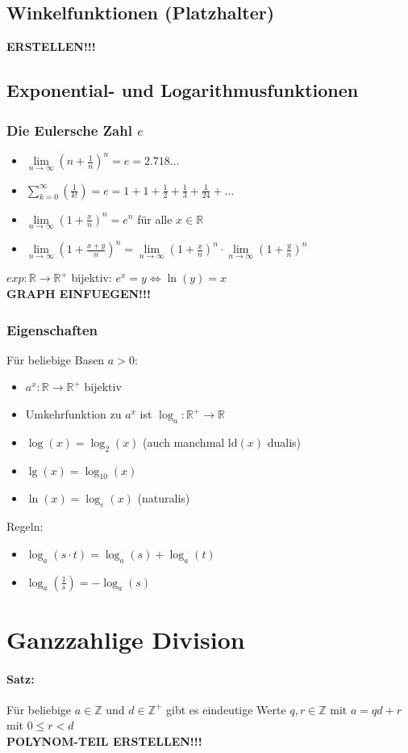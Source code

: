 \subsection{Winkelfunktionen (Platzhalter)}
\textbf{ERSTELLEN!!!}
\subsection{Exponential- und Logarithmusfunktionen}
\subsubsection{Die Eulersche Zahl $e$}
\begin{itemize}
\item $\lim\limits_{n \to \infty}\left(n+\frac{1}{n}\right)^n=e=2.718\ldots$
\item $\sum\limits_{k=0}^{\infty}\left(\frac{1}{k!}\right)=e=1+1+\frac{1}{2}+\frac{1}{3}+\frac{1}{24}+\ldots$
\item $\lim\limits_{n\to\infty}\left(1+\frac{x}{n}\right)^n=e^n$ für alle $x\in\mathbb{R}$
\item $\lim\limits_{n\to\infty}\left(1+\frac{x+y}{n}\right)^n=\lim\limits_{n\to\infty}\left(1+\frac{x}{n}\right)^n \cdot \lim\limits_{n\to\infty}\left(1+\frac{y}{n}\right)^n$
\end{itemize}
$exp: \mathbb{R}\to	\mathbb{R}^+$ bijektiv:
$e^x=y \Leftrightarrow \ln(y)=x$\\
\textbf{GRAPH EINFUEGEN!!!}

\subsubsection{Eigenschaften}
Für beliebige Basen $a>0$:
\begin{itemize}
\item $a^x:\mathbb{R}\to\mathbb{R}^+$ bijektiv
\item Umkehrfunktion zu $a^x$ ist $\log_a:\mathbb{R}^+\to\mathbb{R}$
\item $\log(x)=\log_2(x)$ (auch manchmal $\text{ld}(x)$ \glq dualis\grq )
\item $\lg(x)=\log_{10}(x)$
\item $\ln(x)=\log_e(x)$ (\glq naturalis\grq )
\end{itemize}
Regeln:
\begin{itemize}
\item $\log_a(s\cdot t) = \log_a(s) + \log_a(t)$
\item $\log_a\left(\frac{1}{s}\right)=-\log_a(s)$
\end{itemize}

\section{Ganzzahlige Division}
\paragraph{Satz:}Für beliebige $a\in\mathbb{Z}$ und $d\in\mathbb{Z}^+$ gibt es eindeutige Werte $q,r\in\mathbb{Z}$ mit $a=qd+r$ mit $0\leq r<d$
\\ \textbf{POLYNOM-TEIL ERSTELLEN!!!}
%